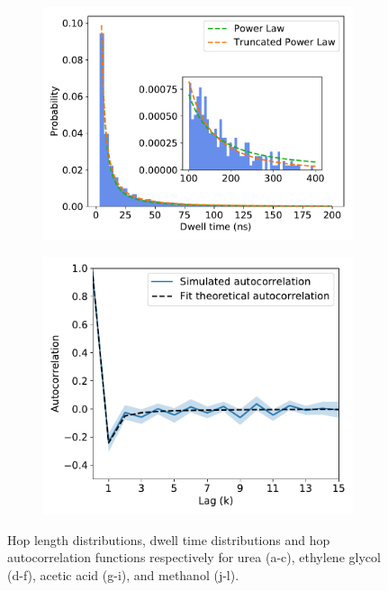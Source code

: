 \documentclass{article}
\begin{document}
\begin{figure}[htb!]
\begin{subfigure}{0.3\textwidth}
  \includegraphics[width=\textwidth]{MET_powerlaw.pdf}
  \caption{}\label{fig:MET_powerlaw}
  \end{subfigure}
  \begin{subfigure}{0.3\textwidth}
  \includegraphics[width=\textwidth]{MET_hop_acf.pdf}
  \caption{}\label{fig:MET_hop_acf}
  \end{subfigure}
  \caption{Hop length distributions, dwell time distributions and hop autocorrelation functions
  respectively for urea (a-c), ethylene glycol (d-f), acetic acid (g-i), and methanol (j-l).
}
\end{figure}
\end{document}
